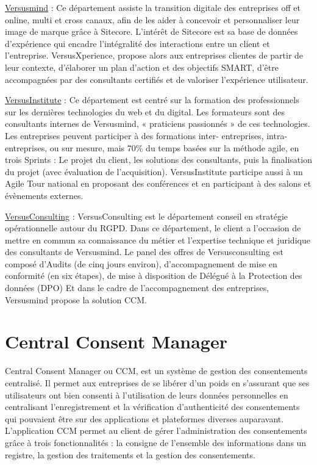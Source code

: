 \documentclass[12pt, a4paper]{report}
\begin{document}
\underline{Versusmind} : Ce département assiste la transition digitale des entreprises off et online, multi et
cross canaux, afin de les aider à concevoir et personnaliser leur image de marque grâce à Sitecore.
L’intérêt de Sitecore est sa base de données d’expérience qui encadre l’intégralité des interactions
entre un client et l’entreprise. VersusXperience, propose alors aux entreprises clientes de partir de leur
contexte, d’élaborer un plan d’action et des objectifs SMART, d’être accompagnées par des consultants
certifiés et de valoriser l’expérience utilisateur.\newline

\underline{VersusInstitute} : Ce département est centré sur la formation des professionnels sur les dernières
technologies du web et du digital. Les formateurs sont des consultants internes de Versusmind,
« praticiens passionnés » de ces technologies. Les entreprises peuvent participer à des formations inter-
entreprises, intra-entreprises, ou sur mesure, mais 70\% du temps basées sur la méthode agile, en trois
Sprints : Le projet du client, les solutions des consultants, puis la finalisation du projet (avec évaluation
de l’acquisition). VersusInstitute participe aussi à un Agile Tour national en proposant des conférences
et en participant à des salons et évènements externes.\newline

\underline{VersusConsulting} : VersusConsulting est le département conseil en stratégie opérationnelle autour du
RGPD. Dans ce département, le client a l’occasion de mettre en commun sa connaissance du métier et
l’expertise technique et juridique des consultants de Versusmind. Le panel des offres de
Versusconsulting est composé d’Audits (de cinq jours environ), d’accompagnement de mise en
conformité (en six étapes), de mise à disposition de Délégué à la Protection des données (DPO)\newline
Et dans le cadre de l'accompagnement des entreprises, Versusmind propose la solution CCM.

\section{Central Consent Manager}
Central Consent Manager ou CCM, est un système de gestion des consentements centralisé. Il
permet aux entreprises de se libérer d’un poids en s’assurant que ses utilisateurs ont bien consenti à
l’utilisation de leurs données personnelles en centralisant l’enregistrement et la vérification
d’authenticité des consentements qui pouvaient être sur des applications et plateformes diverses
auparavant. L’application CCM permet au client de gérer l’administration des consentements grâce à
trois fonctionnalités : la consigne de l’ensemble des informations dans un registre, la gestion des
traitements et la gestion des consentements.\newline
\end{document}
